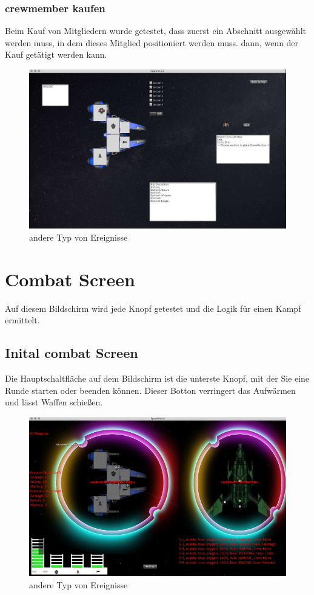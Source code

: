 \documentclass[12pt]{article}
\begin{document}
\subsubsection{crewmember kaufen}
Beim Kauf von Mitgliedern wurde getestet, dass zuerst ein Abschnitt ausgewählt werden muss, in dem dieses Mitglied positioniert werden muss. dann, wenn der Kauf getätigt werden kann.
\begin{figure}[htp]
\centering
\includegraphics[scale=0.4]{TestProtocolBilder/crewmemberkaufen.jpg}
\caption{andere Typ von Ereignisse}
\end{figure}


\newpage
\section{Combat Screen}
Auf diesem Bildschirm wird jede Knopf getestet und die Logik für einen Kampf ermittelt.

\subsection{Inital combat Screen}
Die Hauptschaltfläche auf dem Bildschirm ist die unterste Knopf, mit der Sie eine Runde starten oder beenden können. Dieser Botton verringert das Aufwärmen und lässt Waffen schießen.
\begin{figure}[htp]
\centering
\includegraphics[scale=0.7]{TestProtocolBilder/OptimizedinitialBattelScreen.png}
\caption{andere Typ von Ereignisse}
\end{figure}
\end{document}
